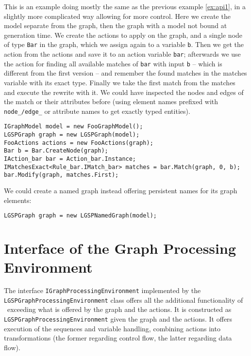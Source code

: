 \begin{example}
This is an example doing mostly the same as the previous example \ref{ex:api1}, in a slightly more complicated way allowing for more control.
Here we create the model separate from the graph, then the graph with a model not bound at generation time.
We create the actions to apply on the graph, and a single node of type \texttt{Bar} in the graph, which we assign again to a variable \texttt{b}.
Then we get the action from the actions and save it to an action variable \texttt{bar};
afterwards we use the action for finding all available matches of \texttt{bar} with input \texttt{b} -- which is different from the first version -- and remember the found matches in the matches variable with its exact type.
Finally we take the first match from the matches and execute the rewrite with it.
We could have inspected the nodes and edges of the match or their attributes before (using element names prefixed with \texttt{node\_/edge\_} or attribute names to get exactly typed entities). 
\begin{verbatim}
IGraphModel model = new FooGraphModel();
LGSPGraph graph = new LGSPGraph(model);
FooActions actions = new FooActions(graph);
Bar b = Bar.CreateNode(graph);
IAction_bar bar = Action_bar.Instance;
IMatchesExact<Rule_bar.IMatch_bar> matches = bar.Match(graph, 0, b);
bar.Modify(graph, matches.First);
\end{verbatim}

We could create a named graph instead offering persistent names for its graph elements:
\begin{verbatim}
LGSPGraph graph = new LGSPNamedGraph(model);
\end{verbatim}
\end{example}

\section{Interface of the Graph Processing Environment}

The interface \texttt{IGraphProcessingEnvironment} implemented by the \texttt{LGSPGraphProcessing\-Environment} class offers all the additional functionality of \GrG~exceeding what is offered by the graph and the actions.
It is constructed as \texttt{LGSPGraphProcessingEnvironment} given the graph and the actions.
It offers execution of the sequences and variable handling, combining actions into transformations
(the former regarding control flow, the latter regarding data flow).


